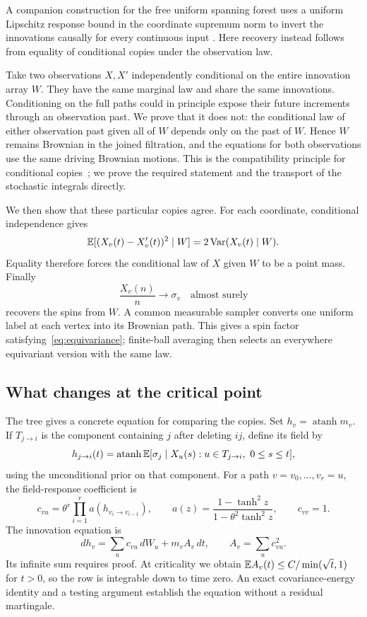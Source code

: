 A companion construction for the free uniform spanning forest uses a
uniform Lipschitz response bound in the coordinate supremum norm to
invert the innovations causally for every continuous input
\cite[Section~4]{OpenAIFUSF2026}.
Here recovery instead follows from equality of conditional copies under
the observation law.

Take two observations $X,X'$ independently conditional on the entire
innovation array $W$. They have the same marginal law and share the
same innovations. Conditioning on the full paths could in principle
expose their future increments through an observation past. We prove
that it does not: the conditional law of either observation past given
all of $W$ depends only on the past of $W$. Hence $W$ remains Brownian
in the joined filtration, and the equations for both observations use
the same driving Brownian motions. This is the compatibility principle
for conditional copies~\cite[Lemmas~2.11--2.12 in arXiv:1305.6747v2]{Kurtz2014};
we prove the required statement
and the transport of the stochastic integrals directly.

We then show that these particular copies agree. For each coordinate,
conditional independence gives
\[
 \mathbb E[(X_v(t)-X'_v(t))^2\mid W]
                  =2\operatorname{Var}(X_v(t)\mid W).
\]
Equality therefore forces the conditional law of $X$ given
$W$ to be a point mass. Finally
\[
                         \frac{X_v(n)}n\longrightarrow\sigma_v
                           \quad\text{almost surely}
\]
recovers the spins from $W$. A common measurable sampler converts one
uniform label at each vertex into its Brownian path. This gives a spin
factor satisfying~\eqref{eq:equivariance}; finite-ball averaging then
selects an everywhere equivariant version with the same law.

\subsection{What changes at the critical point}

The tree gives a concrete equation for comparing the copies. Set
$h_v=\operatorname{atanh}m_v$. If $T_{j\to i}$ is the component containing
$j$ after deleting $ij$, define its field by
\[
 h_{j\to i}(t)=\operatorname{atanh}
   \mathbb E[\sigma_j\mid X_u(s):u\in T_{j\to i},\ 0\le s\le t],
\]
using the unconditional prior on that component.
For a path $v=v_0,\ldots,v_r=u$, the field-response
coefficient is
\[
 c_{vu}=\theta^r\prod_{i=1}^r a(h_{v_i\to v_{i-1}}),
 \qquad
 a(z)=\frac{1-\tanh^2z}{1-\theta^2\tanh^2z},\qquad c_{vv}=1.
\]
The innovation equation is
\[
 dh_v=\sum_u c_{vu}\,dW_u+m_v A_v\,dt,
                  \qquad A_v=\sum_u c_{vu}^2.
\]
Its infinite sum requires proof. At criticality we obtain
$\mathbb E A_v(t)\le C/\min(\sqrt t,1)$ for $t>0$, so the row is integrable
down to time zero. An exact covariance-energy identity and a testing
argument establish the equation without a residual martingale.

